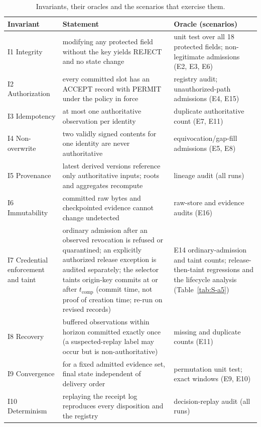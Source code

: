 \documentclass[10pt,a4paper]{article}
\begin{document}
\begin{table}[!htbp]
\caption{Invariants, their oracles and the scenarios that exercise them.\label{tab:S-invariants}}
\footnotesize
\begin{tabularx}{\linewidth}{lXX}
\toprule
\textbf{Invariant} & \textbf{Statement} & \textbf{Oracle (scenarios)}\\
\midrule
I1 Integrity & modifying any protected field without the key yields REJECT and no state change & unit test over all 18 protected fields; non-legitimate admissions (E2, E3, E6)\\
I2 Authorization & every committed slot has an ACCEPT record with PERMIT under the policy in force & registry audit; unauthorized-path admissions (E4, E15)\\
I3 Idempotency & at most one authoritative observation per identity & duplicate authoritative count (E7, E11)\\
I4 Non-overwrite & two validly signed contents for one identity are never authoritative & equivocation/gap-fill admissions (E5, E8)\\
I5 Provenance & latest derived versions reference only authoritative inputs; roots and aggregates recompute & lineage audit (all runs)\\
I6 Immutability & committed raw bytes and checkpointed evidence cannot change undetected & raw-store and evidence audits (E16)\\
I7 Credential enforcement and taint & ordinary admission after an observed revocation is refused or quarantined; an explicitly authorized release exception is audited separately; the selector taints origin-key commits at or after $t_\mathrm{comp}$ (commit time, not proof of creation time; re-run on revised records) & E14 ordinary-admission and taint counts; release-then-taint regressions and the lifecycle analysis (Table~\ref{tab:S-a5})\\
I8 Recovery & buffered observations within horizon committed exactly once (a suspected-replay label may occur but is non-authoritative) & missing and duplicate counts (E11)\\
I9 Convergence & for a fixed admitted evidence set, final state independent of delivery order & permutation unit test; exact windows (E9, E10)\\
I10 Determinism & replaying the receipt log reproduces every disposition and the registry & decision-replay audit (all runs)\\
\bottomrule
\end{tabularx}
\end{table}
\end{document}
